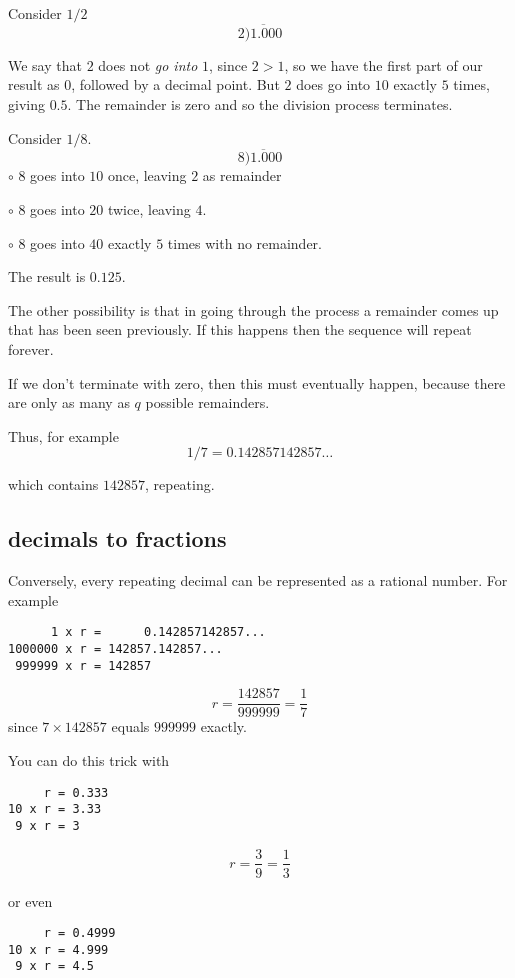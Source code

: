 \documentclass[11pt, oneside]{article}
\begin{document}
Consider $1/2$
\[ 2 \overline{)1.000} \]

We say that $2$ does not \emph{go into} $1$, since $2 > 1$, so we have the first part of our result as $0$, followed by a decimal point.  But $2$ does go into $10$ exactly $5$ times, giving $0.5$.  The remainder is zero and so the division process terminates.

Consider $1/8$.
\[ 8 \overline{)1.000} \]
$\circ$  $8$ goes into $10$ once, leaving $2$ as remainder

$\circ$  $8$ goes into $20$ twice, leaving $4$.  

$\circ$  $8$ goes into $40$ exactly $5$ times with no remainder.

The result is $0.125$.

The other possibility is that in going through the process a remainder comes up that has been seen previously.  If this happens then the sequence will repeat forever.

If we don't terminate with zero, then this must eventually happen, because there are only as many as $q$ possible remainders.

Thus, for example
\[ 1/7 = 0.142857142857 \dots \]

which contains $142857$, repeating.

\subsection*{decimals to fractions}

Conversely, every repeating decimal can be represented as a rational number.  For example

\begin{verbatim}
      1 x r =      0.142857142857...
1000000 x r = 142857.142857...
 999999 x r = 142857
\end{verbatim}

\[ r = \frac{142857}{999999} = \frac{1}{7} \]
since $7 \times 142857$ equals $999999$ exactly.

You can do this trick with 

\begin{verbatim}
     r = 0.333
10 x r = 3.33
 9 x r = 3
\end{verbatim}

\[ r = \frac{3}{9} = \frac{1}{3} \]

or even

\begin{verbatim}
     r = 0.4999
10 x r = 4.999
 9 x r = 4.5
\end{verbatim}
\end{document}
